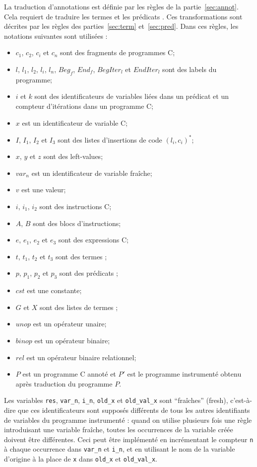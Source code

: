 La traduction d'annotations est définie par les règles de la
partie~\ref{sec:annot}.
Cela requiert de traduire les termes et les prédicats \eacsl.
Ces transformations sont décrites par les règles des parties~\ref{sec:term}
et~\ref{sec:pred}.
Dans ces règles, les notations suivantes sont utilisées :
\begin{itemize}
\item $c_1$, $c_2$, $c_i$ et $c_n$ sont des fragments de programmes C;
\item $l$, $l_1$, $l_2$, $l_i$, $l_n$, $Beg_f$, $End_f$, $BegIter_l$ et
  $EndIter_l$ sont des labels du programme;
\item $i$ et $k$ sont des identificateurs de variables liées
  dans un prédicat \eacsl et un compteur d'itérations dans un programme C;
\item $x$ est un identificateur de variable C;
\item $I$, $I_1$, $I_2$ et $I_3$ sont des listes d'insertions de code
  $(l_i, c_i)^*$;
\item $x$, $y$ et $z$ sont des left-values;
\item $var_n$ est un identificateur de variable fraîche;
\item $v$ est une valeur;
\item $i$, $i_1$, $i_2$ sont des instructions C;
\item $A$, $B$ sont des blocs d'instructions;
\item $e$, $e_1$, $e_2$ et $e_3$ sont des expressions C;
\item $t$, $t_1$, $t_2$ et $t_3$ sont des termes \eacsl;
\item $p$, $p_1$, $p_2$ et $p_3$ sont des prédicats \eacsl;
\item $cst$ est une constante;
\item $G$ et $X$ sont des listes de termes \eacsl;
\item $unop$ est un opérateur unaire;
\item $binop$ est un opérateur binaire;
\item $rel$ est un opérateur binaire relationnel;
\item $P$ est un programme C annoté et $P'$ est le programme instrumenté
  obtenu après traduction du programme $P$.
\end{itemize}

Les variables \lstinline'res', \lstinline'var_n', \lstinline'i_n',
\lstinline|old_x| et \lstinline'old_val_x' sont
``fraîches'' (fresh), c'est-à-dire que ces identificateurs sont supposés
différents de tous les autres identifiants de variables du programme instrumenté
: quand on utilise plusieurs fois une règle introduisant une variable fraîche,
toutes les occurrences de la variable créée doivent être différentes.
Ceci peut être implémenté en incrémentant le compteur \lstinline'n' à chaque
occurrence dans \lstinline'var_n' et \lstinline'i_n', et en utilisant le nom de
la variable d'origine à la place de \lstinline'x' dans \lstinline'old_x' et
\lstinline'old_val_x'.

